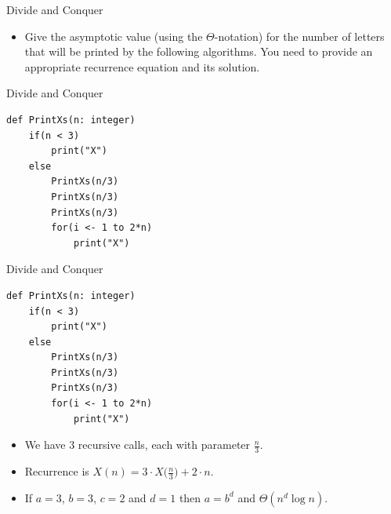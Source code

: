 \documentclass{beamer}
\begin{document}
\begin{frame}{Divide and Conquer}
    \centering
    \begin{itemize}
        \item Give the asymptotic value (using the $\Theta$-notation) for the number of letters that will be printed by the following algorithms.  You need to provide an appropriate recurrence equation and its solution.
    \end{itemize}
\end{frame}

\begin{frame}[fragile]{Divide and Conquer}
    \begin{center}
    \begin{minipage}{0.5\textwidth}
    \begin{verbatim}
def PrintXs(n: integer)
    if(n < 3)
        print("X")
    else
        PrintXs(n/3)
        PrintXs(n/3)
        PrintXs(n/3)
        for(i <- 1 to 2*n)
            print("X")
    \end{verbatim}
    \end{minipage}
    \end{center}
\end{frame}

\begin{frame}[fragile]{Divide and Conquer}
    \begin{center}
    \begin{minipage}{0.5\textwidth}
    \begin{verbatim}
def PrintXs(n: integer)
    if(n < 3)
        print("X")
    else
        PrintXs(n/3)
        PrintXs(n/3)
        PrintXs(n/3)
        for(i <- 1 to 2*n)
            print("X")
    \end{verbatim}
    \end{minipage}
    \end{center}
    
    \begin{itemize}
        \item We have 3 recursive calls, each with parameter $\frac{n}{3}$.
        \item Recurrence is $X(n) = 3 \cdot X \Big(\frac{n}{3}\Big) + 2 \cdot n$.
        \item If $a = 3$, $b = 3$, $c = 2$ and $d = 1$ then $a = b^d$ and $\Theta (n^d \log n)$.
    \end{itemize}
\end{frame}
\end{document}
